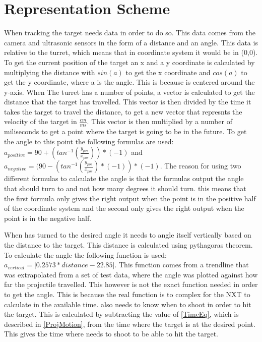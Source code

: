 \chapter{Representation Scheme}
When tracking the target \name needs data in order to do so. This data comes
from the camera and ultrasonic sensors in the form of a distance and an angle.
This data is relative to the turret, which means that in coordinate system it
would be in (0,0). To get the current position of the target an x and a y
coordinate is calculated by multiplying the distance with $sin(a)$ to get the x coordinate and
$cos(a)$ to get the y coordinate, where a is the angle. This is because \name is
centered around the y-axis. When The turret has a number of points, a vector is
calculated to get the distance that the target has travelled. This vector is
then divided by the time it takes the target to travel the distance, to get a new vector that represnts the
velocity of the target in $\frac{cm}{ms}$. This vector is then multiplied by a
number of miliseconds to get a point where the target is going to be in the
future. To get the angle to this point the following formulas are used:
$a_{positive}=90+(tan^{-1}(\frac{y_{pos}}{x_{pos}}))*(-1)$ and
$a_{negative}=(90-(tan^{-1}(\frac{y_{pos}}{x_{pos}})*(-1))*(-1)$. The reason for
using two different formulas to calculate the angle is that the formulas output
the angle that \name should turn to and not how many degrees it should turn.
this means that the first formula only gives the right output when the point is
in the positive half of the coordinate system and the second only gives the
right output when the point is in the negative half.\nl

When \name has turned to the desired angle it needs to angle itself vertically
based on the distance to the target. This distance is calculated using
pythagoras theorem. To calculate the angle the following function is used:\\
$a_{vertical}=| 0.2573*distance-22.85 |$.
This function comes from a trendline that was extrapolated from a set of test
data, where the angle was plotted against how far the projectile travelled. This
however is not the exact function needed in order to get the angle. This is
because the real function is to complex for the NXT to calculate in the
available time. \name also needs to know when to shoot in order to hit the
target.
This is calculated by subtracting the value of \autoref{TimeEq}, which is described in
\autoref{ProjMotion}, from the time where the target is at the desired point.
This gives the time where \name needs to shoot to be able to hit the target.
